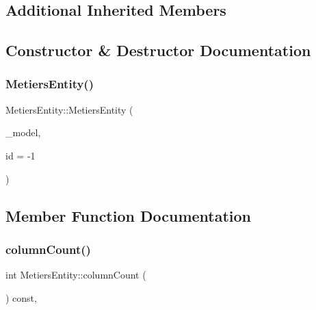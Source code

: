 \subsection*{Additional Inherited Members}


\subsection{Constructor \& Destructor Documentation}
\mbox{\label{classobjecttree_1_1_metiers_entity_a7599e8262e7e379ba32b88ba4d88f3f6}} 
\subsubsection{\texorpdfstring{MetiersEntity()}{MetiersEntity()}}
{\footnotesize\ttfamily Metiers\+Entity\+::\+Metiers\+Entity (\begin{DoxyParamCaption}\item[{\mbox{\hyperlink{class_object_tree_model}{Object\+Tree\+Model}} $\ast$}]{\+\_\+model,  }\item[{int}]{id = {\ttfamily -\/1} }\end{DoxyParamCaption})}



\subsection{Member Function Documentation}
\mbox{\label{classobjecttree_1_1_metiers_entity_afbf2645b47ca0ecf76d0ad022f2cb1e9}} 
\subsubsection{\texorpdfstring{columnCount()}{columnCount()}}
{\footnotesize\ttfamily int Metiers\+Entity\+::column\+Count (\begin{DoxyParamCaption}{ }\end{DoxyParamCaption}) const\hspace{0.3cm}{\ttfamily [override]}, {\ttfamily [virtual]}}



